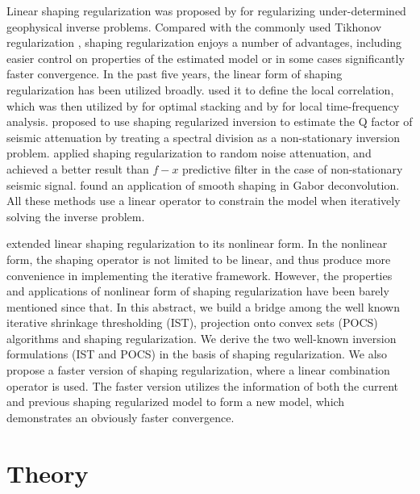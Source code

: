 Linear shaping regularization was proposed by \cite{fomel2} for regularizing under-determined geophysical inverse problems. Compared with the commonly used Tikhonov regularization \cite[]{tikhonov1963}, shaping regularization enjoys a number of advantages, including easier control on properties of the estimated model or in some cases significantly faster convergence. In the past five years, the linear form of shaping regularization has been utilized broadly. \cite{fomel2007localattr} used it to define the local correlation, which was then utilized by \cite{guochang2009,guochang20111} for optimal stacking and by \cite{guochang20113,liuyang2012} for local time-frequency analysis. \cite{guochang2010} proposed to use shaping regularized inversion to estimate the Q factor of seismic attenuation by 
treating a spectral division as a non-stationary inversion problem. \cite{guochang2012} applied shaping regularization to random noise attenuation, and achieved a better result than $f-x$ predictive filter in the case of non-stationary seismic signal. \cite{zengbao2012} found an application of smooth shaping in Gabor deconvolution. All these methods use a linear operator to constrain the model when iteratively solving the inverse problem.

\cite{fomel2} extended linear shaping regularization to its nonlinear form. In the nonlinear form, the shaping operator is not limited to be linear, and thus produce more convenience in implementing the iterative framework. However, the properties and applications of nonlinear form of shaping regularization have been barely mentioned since that. In this abstract, we build a bridge among the well known iterative shrinkage thresholding (IST), projection onto convex sets (POCS) algorithms and shaping regularization. We derive the two well-known inversion formulations (IST and POCS) in the basis of shaping regularization. We also propose a faster version of shaping regularization, where a linear combination operator is used. The faster version utilizes the information of both the current and previous shaping regularized model to form a new model, which demonstrates an obviously faster convergence.

\section{Theory}
